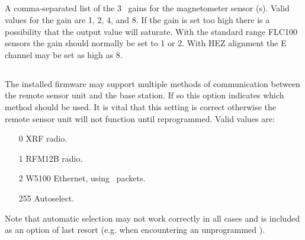 
\subsection{}
A comma-separated list of the 3 \itwoc\ gains for the magnetometer
sensor \adc(s). Valid values for the gain are 1, 2, 4, and 8. If the
gain is set too high there is a possibility that the output value will
saturate. With the standard  range FLC100 sensors the gain
should normally be set to 1 or 2. With HEZ alignment the E channel may
be set as high as 8.



\subsection{}
The installed firmware may support multiple methods of communication
between the remote sensor unit and the base station. If so this option
indicates which method should be used. It is vital that this setting
is correct otherwise the remote sensor unit will not function until
reprogrammed. Valid values are:
\begin{enumerate}
\item[0] XRF radio.
\item[1] RFM12B radio.
\item[2] W5100 Ethernet, using \udp\ packets.
\item[255] Autoselect. 
\end{enumerate}
Note that automatic selection may not work correctly in all cases and
is included as an option of last resort (e.g. when encountering an
unprogrammed \eeprom).

